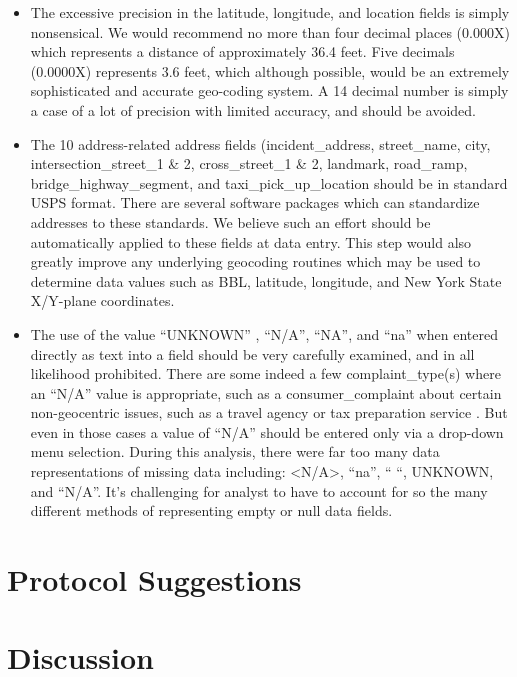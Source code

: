 \documentclass[12pt, titlepage]{article}
\begin{document}
\begin{itemize}
	\item The excessive precision in the latitude, longitude, and location 
	fields is simply nonsensical.  We would recommend no more than 
	four decimal places (0.000X) which represents a distance of approximately 
	36.4 feet. Five decimals (0.0000X) represents 3.6 feet, which although 
	possible, would be an extremely sophisticated and accurate 
	geo-coding system. A 14 decimal number is simply a case of a lot 
	of precision with limited accuracy, and should be avoided.

	\item The 10 address-related address fields (incident\_address, 
	street\_name, city, intersection\_street\_1 \& 2, cross\_street\_1 \& 2,  
	landmark, road\_ramp, bridge\_highway\_segment, and 
	taxi\_pick\_up\_location should be in standard USPS format. There 
	are several software packages which can standardize addresses to 
	these standards. We believe such an effort should be automatically 
	applied to these fields at data entry. This step would also greatly 
	improve any underlying geocoding routines which 	may be used 
	to determine data values such as BBL, latitude, longitude, and New 
	York State X/Y-plane coordinates.
	
	\item The use of the value ``UNKNOWN'' , ``N/A'', ``NA'', and ``na'' when 
	entered directly as text into a field should be very carefully examined, 
	and in all likelihood prohibited.  There are some indeed a few 
	complaint\_type(s) where an ``N/A'' value is appropriate, such 
	as a consumer\_complaint about certain non-geocentric issues, such 
	as a travel agency or tax preparation service . But even in those cases 
	a value of ``N/A'' should be entered only via a drop-down menu 
	selection. During this analysis, there were far too many data 
	representations of missing data including: <N/A>, ``na'', `` ``, UNKNOWN, 
	and ``N/A''. It's challenging for analyst to have to account for so 
	the many different methods of representing empty or null data fields. 
\end{itemize}



\section{Protocol Suggestions} \label{sec:protocol}



\section{Discussion} \label{sec:discussion}



\end{document}
